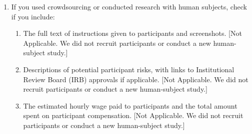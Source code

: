\begin{enumerate}
  \item If you used crowdsourcing or conducted research with human subjects, check if you include:
  \begin{enumerate}
    \item The full text of instructions given to participants and screenshots. [Not Applicable. We did not recruit participants or conduct a new human-subject study.]
    \item Descriptions of potential participant risks, with links to Institutional Review Board (IRB) approvals if applicable. [Not Applicable. We did not recruit participants or conduct a new human-subject study.]
    \item The estimated hourly wage paid to participants and the total amount spent on participant compensation. [Not Applicable. We did not recruit participants or conduct a new human-subject study.]
  \end{enumerate}

\end{enumerate}
